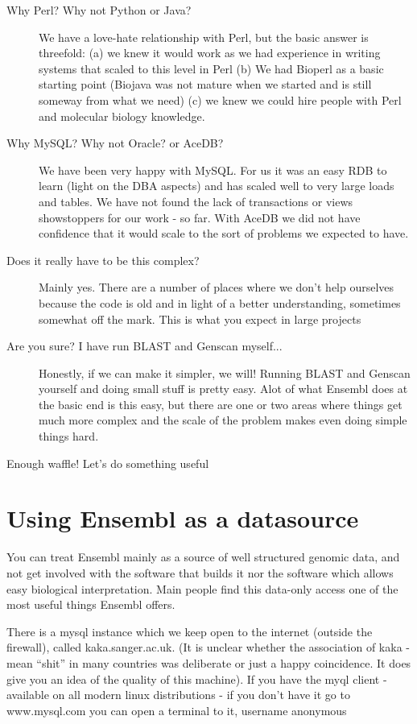 \documentclass[11pt,a4paper]{article}
\begin{document}
\begin{description}

\item[Why Perl? Why not Python or Java?] We have a love-hate
relationship with Perl, but the basic answer is threefold: (a) we knew
it would work as we had experience in writing systems that scaled to
this level in Perl (b) We had Bioperl as a basic starting point
(Biojava was not mature when we started and is still someway from what
we need) (c) we knew we could hire people with Perl and molecular
biology knowledge.

\item[Why MySQL? Why not Oracle? or AceDB?] We have been very happy
with MySQL.  For us it was an easy RDB to learn (light on the DBA
aspects) and has scaled well to very large loads and tables. We have
not found the lack of transactions or views showstoppers for our work
- so far. With AceDB we did not have confidence that it would scale to
the sort of problems we expected to have.

\item[Does it really have to be this complex?] Mainly yes. There are a
number of places where we don't help ourselves because the code is old
and in light of a better understanding, sometimes somewhat off the
mark. This is what you expect in large projects

\item[Are you sure? I have run BLAST and Genscan myself...] Honestly,
if we can make it simpler, we will! Running BLAST and Genscan yourself
and doing small stuff is pretty easy. Alot of what Ensembl does at the
basic end is this easy, but there are one or two areas where things
get much more complex and the scale of the problem makes even doing
simple things hard.

\end{description}

Enough waffle! Let's do something useful

\section{Using Ensembl as a datasource}

You can treat Ensembl mainly as a source of well structured genomic data, and not
get involved with the software that builds it nor the software which allows easy 
biological interpretation. Main people find this data-only access one of the most
useful things Ensembl offers.

There is a mysql instance which we keep open to the internet (outside
the firewall), called kaka.sanger.ac.uk.  (It is unclear whether the
association of kaka - mean ``shit'' in many countries was deliberate
or just a happy coincidence. It does give you an idea of the quality
of this machine). If you have the myql client - available on all modern
linux distributions - if you don't have it go to www.mysql.com you can open
a terminal to it, username anonymous
\end{document}
